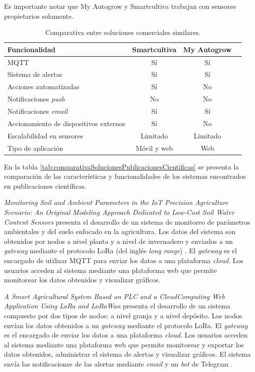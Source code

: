 Es importante notar que My Autogrow y Smartcultiva trabajan con sensores propietarios solamente.

\begin{table}[H]
	\centering
	\caption[Comparativa entre soluciones comerciales similares]{Comparativa entre soluciones comerciales similares.}
	\begin{tabular}{l c c c}    
		\toprule
		\textbf{Funcionalidad} & \textbf{Smartcultiva} & \textbf{My Autogrow} \\
		\midrule
		MQTT & Sí & Sí \\
		Sistema de alertas & Sí & Sí \\
		Acciones automatizadas & Sí & No \\
		Notificaciones \emph{push} \citep{WEBSITE:NOTIFICACIONESPUSH} & No & No \\
		Notificaciones \textit{email} & Sí & Sí \\
		Accionamiento de dispositivos externos & Sí & No \\
		Escalabilidad en sensores & Limitado & Limitado \\
		Tipo de aplicación & Móvil y web & Web \\
		\bottomrule
		\hline
	\end{tabular}
	\label{tab:comparativaSolucionesNacionalesInternacionales}
\end{table}

En la tabla \ref{tab:comparativaSolucionesPublicacionesCientificas} se presenta la comparación de las características y funcionalidades de los sistemas encontrados en publicaciones científicas.

\emph{Monitoring Soil and Ambient Parameters in the IoT Precision Agriculture Scenario: An Original Modeling Approach Dedicated to Low-Cost Soil Water Content Sensors} \citep{WEBSITE:SOLUCIONSIMILARCIENTIFICA2} presenta el desarrollo de un sistema de monitoreo de parámetros ambientales y del suelo enfocado en la agricultura. Los datos del sistema son obtenidos por nodos a nivel planta y a nivel de invernadero y enviados a un \emph{gateway} mediante el protocolo LoRa (del inglés \textit{long range}) \citep{WEBSITE:LORA}. El \emph{gateway} es el encargado de utilizar MQTT para enviar los datos a una plataforma \emph{cloud}. Los usuarios acceden al sistema mediante una plataforma web que permite monitorear los datos obtenidos y visualizar gráficos.

\emph{A Smart Agricultural System Based on PLC and a CloudComputing Web Application Using LoRa and LoRaWan} \citep{WEBSITE:SOLUCIONSIMILARCIENTIFICA3} presenta el desarrollo de un sistema compuesto por dos tipos de nodos: a nivel granja y a nivel depósito. Los nodos envían los datos obtenidos a un \emph{gateway} mediante el protocolo LoRa. El \emph{gateway} es el encargado de enviar los datos a una plataforma \emph{cloud}. Los usuarios acceden al sistema mediante una plataforma web que permite monitorear y exportar los datos obtenidos, administrar el sistema de alertas y visualizar gráficos. El sistema envía las notificaciones de las alertas mediante \textit{email} y un \textit{bot} \citep{WEBSITE:BOT} de Telegram \citep{WEBSITE:TELEGRAM}.

